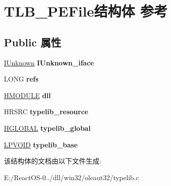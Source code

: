 \hypertarget{struct_t_l_b___p_e_file}{}\section{T\+L\+B\+\_\+\+P\+E\+File结构体 参考}
\label{struct_t_l_b___p_e_file}
\subsection*{Public 属性}
\begin{DoxyCompactItemize}
\item 
\mbox{\label{struct_t_l_b___p_e_file_a5cc0c37a4e8789c2c0a331a0437b81d1}} 
\hyperlink{interface_i_unknown}{I\+Unknown} {\bfseries I\+Unknown\+\_\+iface}
\item 
\mbox{\label{struct_t_l_b___p_e_file_a12c9c7c6e0384216e3df9895f9d2c037}} 
L\+O\+NG {\bfseries refs}
\item 
\mbox{\label{struct_t_l_b___p_e_file_a029455eb75bd4db023d7a3b592f8cdb2}} 
\hyperlink{interfacevoid}{H\+M\+O\+D\+U\+LE} {\bfseries dll}
\item 
\mbox{\label{struct_t_l_b___p_e_file_ae75897daf4e302c09a296b4a356cb209}} 
H\+R\+S\+RC {\bfseries typelib\+\_\+resource}
\item 
\mbox{\label{struct_t_l_b___p_e_file_a5fb0acfa11ceafe502c9ce646831e67b}} 
\hyperlink{interfacevoid}{H\+G\+L\+O\+B\+AL} {\bfseries typelib\+\_\+global}
\item 
\mbox{\label{struct_t_l_b___p_e_file_aa29234b85a27f5b10ee0ba33e90233e0}} 
\hyperlink{interfacevoid}{L\+P\+V\+O\+ID} {\bfseries typelib\+\_\+base}
\end{DoxyCompactItemize}


该结构体的文档由以下文件生成\+:\begin{DoxyCompactItemize}
\item 
E\+:/\+React\+O\+S-\/0../dll/win32/oleaut32/typelib.\+c\end{DoxyCompactItemize}
